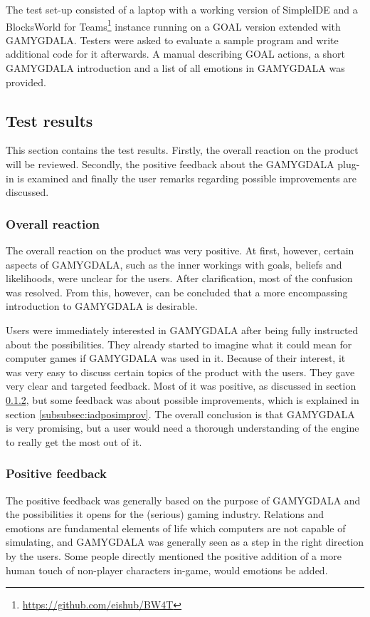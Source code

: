 The test set-up consisted of a laptop with a working version of SimpleIDE and a BlocksWorld for Teams\footnote{\url{https://github.com/eishub/BW4T}} instance running on a GOAL version extended with GAMYGDALA. Testers were asked to evaluate a sample program and write additional code for it afterwards. A manual describing GOAL actions, a short GAMYGDALA introduction and a list of all emotions in GAMYGDALA was provided.

\subsection{Test results}
\label{subsec:iadres}
This section contains the test results. Firstly, the overall reaction on the product will be reviewed. Secondly, the positive feedback about the GAMYGDALA plug-in is examined and finally the user remarks regarding possible improvements are discussed.

\subsubsection{Overall reaction}
The overall reaction on the product was very positive. At first, however, certain aspects of GAMYGDALA, such as the inner workings with goals, beliefs and likelihoods, were unclear for the users. After clarification, most of the confusion was resolved. From this, however, can be concluded that a more encompassing introduction to GAMYGDALA is desirable.

Users were immediately interested in GAMYGDALA after being fully instructed about the possibilities. They already started to imagine what it could mean for computer games if GAMYGDALA was used in it. Because of their interest, it was very easy to discuss certain topics of the product with the users. They gave very clear and targeted feedback.  Most of it was positive, as discussed in section \ref{subsubsec:iadposfeedb}, but some feedback was about possible improvements, which is explained in section \ref{subsubsec:iadposimprov}. The overall conclusion is that GAMYGDALA is very promising, but a user would need a thorough understanding of the engine to really get the most out of it.

\subsubsection{Positive feedback}
\label{subsubsec:iadposfeedb}
The positive feedback was generally based on the purpose of GAMYGDALA and the possibilities it opens for the (serious) gaming industry. Relations and emotions are fundamental elements of life which computers are not capable of simulating, and GAMYGDALA was generally seen as a step in the right direction by the users. Some people directly mentioned the positive addition of a more human touch of non-player characters in-game, would emotions be added.\\

